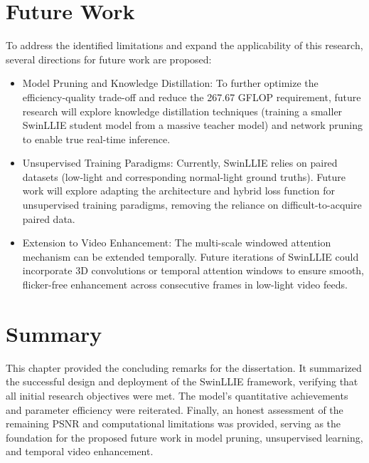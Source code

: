\documentclass[12pt, a4paper]{report}
\begin{document}
\section{Future Work}
To address the identified limitations and expand the applicability of this research, several directions for future work are proposed:
\begin{itemize}
    \item Model Pruning and Knowledge Distillation: To further optimize the efficiency-quality trade-off and reduce the 267.67 GFLOP requirement, future research will explore knowledge distillation techniques (training a smaller SwinLLIE student model from a massive teacher model) and network pruning to enable true real-time inference.
    \item Unsupervised Training Paradigms: Currently, SwinLLIE relies on paired datasets (low-light and corresponding normal-light ground truths). Future work will explore adapting the architecture and hybrid loss function for unsupervised training paradigms, removing the reliance on difficult-to-acquire paired data.
    \item Extension to Video Enhancement: The multi-scale windowed attention mechanism can be extended temporally. Future iterations of SwinLLIE could incorporate 3D convolutions or temporal attention windows to ensure smooth, flicker-free enhancement across consecutive frames in low-light video feeds.
\end{itemize}

\section{Summary}
This chapter provided the concluding remarks for the dissertation. It summarized the successful design and deployment of the SwinLLIE framework, verifying that all initial research objectives were met. The model’s quantitative achievements and parameter efficiency were reiterated. Finally, an honest assessment of the remaining PSNR and computational limitations was provided, serving as the foundation for the proposed future work in model pruning, unsupervised learning, and temporal video enhancement.

\end{document}
